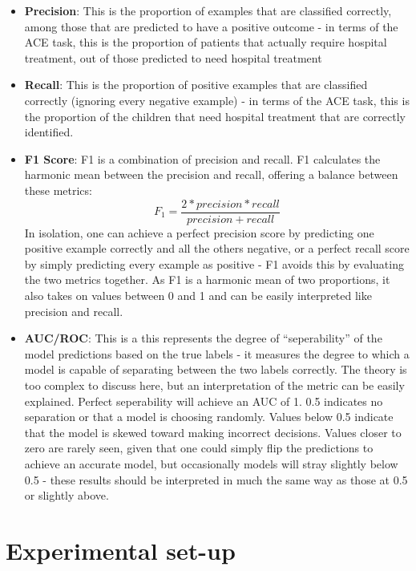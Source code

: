\begin{itemize}
    \item \textbf{Precision}: This is the proportion of examples that are classified correctly, among those that are predicted to have a positive outcome - in terms of the ACE task, this is the proportion of patients that actually require hospital treatment, out of those predicted to need hospital treatment
    \item \textbf{Recall}: This is the proportion of positive examples that are classified correctly (ignoring every negative example) - in terms of the ACE task, this is the proportion of the children that need hospital treatment that are correctly identified.
    \item \textbf{F1 Score}: F1 is a combination of precision and recall. F1 calculates the harmonic mean between the precision and recall, offering a balance between these metrics:
    \begin{equation}
        F_1 = \frac{2*precision * recall} {precision + recall}
        \label{eq:F1}
    \end{equation}
    In isolation, one can achieve a perfect precision score by predicting one positive example correctly and all the others negative, or a perfect recall score by simply predicting every example as positive - F1 avoids this by evaluating the two metrics together. As F1 is a harmonic mean of two proportions, it also takes on values between 0 and 1 and can be easily interpreted like precision and recall.
    \item \textbf{AUC/ROC}: This is a this represents the degree of ``seperability'' of the model predictions based on the true labels - it measures the degree to which a model is capable of separating between the two labels correctly. The theory is too complex to discuss here, but an interpretation of the metric can be easily explained. Perfect seperability will achieve an AUC of 1. 0.5 indicates no separation or that a model is choosing randomly. Values below 0.5 indicate that the model is skewed toward making incorrect decisions. Values closer to zero are rarely seen, given that one could simply flip the predictions to achieve an accurate model, but occasionally models will stray slightly below 0.5 - these results should be interpreted in much the same way as those at 0.5 or slightly above.
\end{itemize}

\section{Experimental set-up}\label{sec:experimental-set-up}

